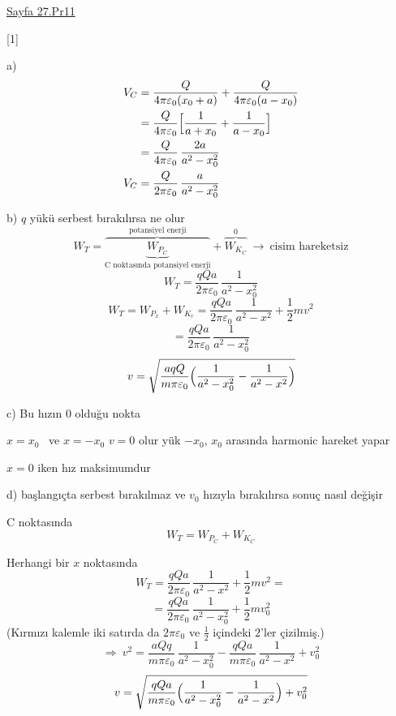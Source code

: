\documentclass[11pt,a4paper]{article}
\begin{document}

\noindent\underline{Sayfa 27.Pr11}

[1]


a)
\begin{align*}
  V_C &= \frac{Q}{4\pi\varepsilon_0(x_0+a)}+\frac{Q}{4\pi\varepsilon_0(a-x_0)} \\
      &= \frac{Q}{4\pi\varepsilon_0}\Bigl[\frac{1}{a+x_0}+\frac{1}{a-x_0}\Bigr] \\
      &= \frac{Q}{4\pi\varepsilon_0}\,\frac{2a}{a^2-x_0^2} \\
  V_C &= \frac{Q}{2\pi\varepsilon_0}\,\frac{a}{a^2-x_0^2}
\end{align*}


b) $q$ yükü serbest bırakılırsa ne olur
\[ W_T=\overbrace{\underbrace{W_{P_C}}_{\text{C noktasında potansiyel enerji}}}^{\text{potansiyel enerji}}+\overbrace{W_{K_C}}^{0}\ \to\ \text{cisim hareketsiz} \]
\[ W_T=\frac{qQa}{2\pi\varepsilon_0}\,\frac{1}{a^2-x_0^2} \]
\[ W_T=W_{P_x}+W_{K_c}=\frac{qQa}{2\pi\varepsilon_0}\,\frac{1}{a^2-x^2}+\frac{1}{2}mv^2 \]
\[ =\frac{qQa}{2\pi\varepsilon_0}\,\frac{1}{a^2-x_0^2} \]
\[ v=\sqrt{\frac{aqQ}{m\pi\varepsilon_0}\Bigl(\frac{1}{a^2-x_0^2}-\frac{1}{a^2-x^2}\Bigr)} \]

\noindent c) Bu hızın 0 olduğu nokta

\medskip
\noindent $x=x_0$ \ ve $x=-x_0$ \quad $v=0$ olur \quad yük $-x_0$, $x_0$ arasında harmonic hareket yapar

\medskip
\noindent $x=0$ iken hız maksimumdur

\bigskip
\noindent d) başlangıçta serbest bırakılmaz ve $v_0$ hızıyla bırakılırsa sonuç nasıl değişir

\medskip
\noindent C noktasında
\[ W_T=W_{P_C}+W_{K_C} \]

\noindent Herhangi bir $x$ noktasında
\[ W_T=\frac{qQa}{2\pi\varepsilon_0}\,\frac{1}{a^2-x^2}+\frac{1}{2}mv^2= \]
\[ =\frac{qQa}{2\pi\varepsilon_0}\,\frac{1}{a^2-x_0^2}+\frac{1}{2}mv_0^2 \]
(Kırmızı kalemle iki satırda da $2\pi\varepsilon_0$ ve $\tfrac{1}{2}$ içindeki $2$'ler çizilmiş.)
\[ \Rightarrow\ v^2=\frac{aQq}{m\pi\varepsilon_0}\,\frac{1}{a^2-x_0^2}-\frac{qQa}{m\pi\varepsilon_0}\,\frac{1}{a^2-x^2}+v_0^2 \]
\[ v=\sqrt{\frac{qQa}{m\pi\varepsilon_0}\Bigl(\frac{1}{a^2-x_0^2}-\frac{1}{a^2-x^2}\Bigr)+v_0^2} \]
\end{document}
